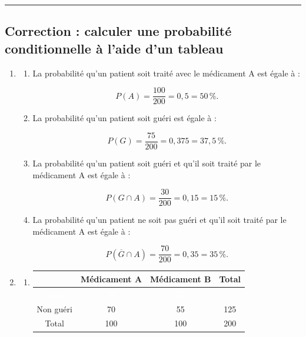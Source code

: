 \documentclass{article}
\theoremstyle{definition}
\begin{document}
\pagestyle{empty}


\large


{
  \normalsize
  \textbf{\Niveau} \hfill \textbf{\Chapitre} \hfill \textbf{\Document}
}
\hrule

\subsection*{Correction : calculer une probabilité conditionnelle à l'aide d'un tableau}

\begin{enumerate}
\item
\begin{enumerate}
\item
La probabilité qu'un patient soit traité avec le médicament A est égale à :

    $$
    P(A) = \frac{100}{200} = 0{,}5 = 50\,\%.
    $$

    \item
    La probabilité qu'un patient soit guéri est égale à :
    
    $$
    P(G) = \frac{75}{200} = 0{,}375 = 37{,}5\,\%.
    $$

    \item
    La probabilité qu'un patient soit guéri et qu'il soit traité par le médicament A est égale à :
    
    $$
    P(G \cap A) = \frac{30}{200} = 0{,}15 = 15\,\%.
    $$

    \item
    La probabilité qu'un patient ne soit pas guéri et qu'il soit traité par le médicament A est égale à :
    
    $$
    P(\overline{G} \cap A) = \frac{70}{200} = 0{,}35 = 35\,\%.
    $$
\end{enumerate}

\item
\begin{enumerate}
    \item
    \begin{center}
    \begin{tabular}{|c|c|c|c|}
    \hline
    & Médicament A & Médicament B & Total \\
    \hline
    \rowcolor{cyan!70}
    \textcolor{white}{Guéri} & \textcolor{white}{30} & \textcolor{white}{45} & \textcolor{white}{75} \\
    \hline
    Non guéri & 70 & 55 & 125 \\
    \hline
    Total & 100 & 100 & 200 \\
    \hline
    \end{tabular}
    \end{center}


\end{enumerate}
\end{enumerate}
\end{document}

